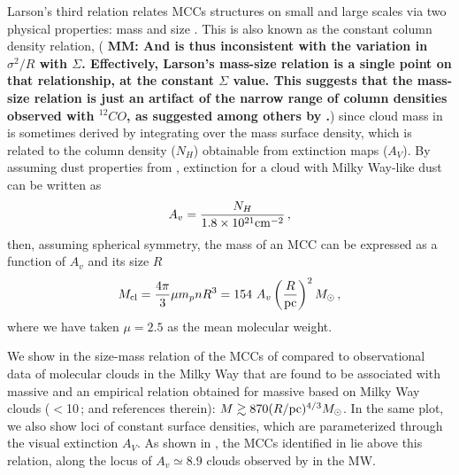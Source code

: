 \IfFileExists{emulateapjlegacy.cls}{\documentclass[iop]{emulateapjlegacy}}{\documentclass[iop]{emulateapj}}
\newcommand{\MM}[1]{({\bf \color{mmcolor} MM: #1})}
\begin{document}
Larson's third relation relates MCCs structures on small and large
scales via two physical properties: mass and size \citep{Larson81a,
  McKee07a}. This is also known as the constant column density
relation,
\MM{And is thus inconsistent with the variation in $\sigma^2/R$ with
  $\Sigma$.  Effectively, Larson's mass-size relation is a single
  point on that relationship, at the constant $\Sigma$ value.  This
  suggests that the mass-size relation is just an artifact of the
  narrow range of column densities observed with $^{12}CO$, as
  suggested among others by \citet{Ballesteros11}.}
 since cloud mass in \obs is sometimes derived by integrating over the mass surface density, which is related to the column density ($N_H$) obtainable from extinction maps ($A_V$). By assuming dust properties from \citet[][]{weingartner:2001}, extinction for a cloud with Milky Way-like dust can be written as 
\begin{equation}
A_v = \frac{N_H}{1.8 \times 10^{21} {\rm cm}^{-2}}\,,
\end{equation}
then, assuming spherical symmetry, the mass of an MCC can be expressed as a function of $A_v$ and its size $R$
\begin{equation}\label{eqn:constantcolumndensity}
M_{\rm cl} = \frac{4\pi}{3} \mu m_p n R^3 = 154~A_v \left(\frac{R}{\rm pc}\right)^2 \Msun \,,
\end{equation}
where we have taken $\mu = 2.5$ as the mean molecular weight.

We show in  the size-mass relation of the MCCs of \flower compared to observational data of molecular clouds in the Milky Way that are found to be associated with massive \SF \citep{Beuther02a, Mueller02a, Hill05a, Motte07a} and an empirical relation obtained for massive \SF based on Milky Way clouds ($<$10\,\Msun; \citealt{Kauffmann10b, Kauffmann10c} and references therein): $M \gtrsim 870(R/{\rm pc})^{4/3} M_\odot$.
%
In the same plot, we also show loci of constant surface densities, which are parameterized through the visual extinction $A_V$. As shown in , the MCCs identified in \flower lie above this relation, along the locus of $A_v \simeq 8.9$ clouds observed by \citet{Lombardi10a} in the MW.
%
\end{document}
